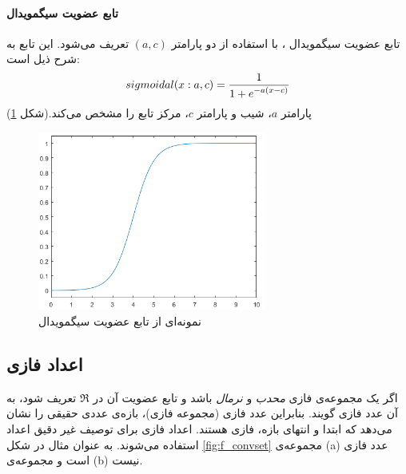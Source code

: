 \paragraph{تابع عضویت سیگمویدال}
تابع عضویت سیگمویدال
،
با استفاده از دو پارامتر $(a, c)$ تعریف می‌شود. این تابع به شرح ذیل است:
\begin{equation}\label{eq:e_fset_memfunc_sigmoidal}
sigmoidal (x: a, c) = \frac{1}{1+\mathlarger{e^{-a(x-c)}}} 
	\end{equation}
	پارامتر $a$، شیب و پارامتر $c$، مرکز تابع را مشخص می‌کند.(شکل \ref{fig:f_18})
\cite{yen1999fuzzy}
	\begin{figure}[h]
		\centering 
		\includegraphics[width=75mm]{Images/Fig18.png}
		\vspace{-0.5cm}
		\caption{نمونه‌ای از تابع عضویت سیگمویدال}\label{fig:f_18}
	\end{figure}
 \subsection{‌اعداد فازی} 
 اگر یک مجموعه‌ی فازی \textit{محدب} و \textit{نرمال} باشد و تابع عضویت آن در 
 $\Re$
 تعریف شود، به آن عدد فازی گویند. بنابراین عدد فازی (مجموعه فازی)، بازه‌ی عددی حقیقی را نشان می‌دهد که ابتدا و انتهای بازه، فازی هستند.
 \cite{Lee2005}
  اعداد فازی برای توصیف غیر دقیق اعداد استفاده می‌شوند. 
  به عنوان مثال در شکل 
 \ref{fig:f_convset}
 مجموعه‌ی (a) عدد فازی است و مجموعه‌ی (b) نیست.
